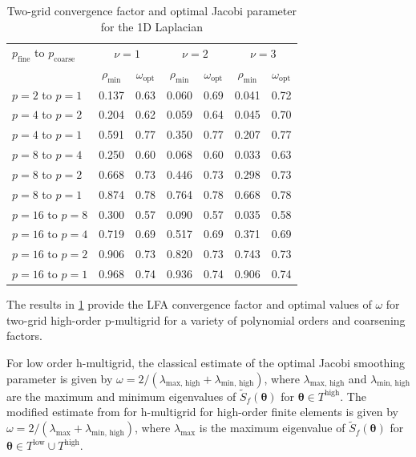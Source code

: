 \documentclass[review]{siamart190516}
\begin{document}
\begin{table}[ht!]
\begin{center}
\begin{tabular}{l cc cc cc}
  \toprule
  $p_{\text{fine}}$ to $p_{\text{coarse}}$  &  \multicolumn{2}{c}{$\nu = 1$}  &  \multicolumn{2}{c}{$\nu = 2$}  &  \multicolumn{2}{c}{$\nu = 3$}  \\
                       &  $\rho_{\min}$ & $\omega_{\text{opt}}$  &  $\rho_{\min}$ & $\omega_{\text{opt}}$  &  $\rho_{\min}$ & $\omega_{\text{opt}}$  \\
  \toprule
  $p = 2$ to $p = 1$   &  0.137 & 0.63  &  0.060 & 0.69  &  0.041 & 0.72   \\
  \midrule
  $p = 4$ to $p = 2$   &  0.204 & 0.62  &  0.059 & 0.64  &  0.045 & 0.70   \\
  $p = 4$ to $p = 1$   &  0.591 & 0.77  &  0.350 & 0.77  &  0.207 & 0.77   \\
  \midrule
  $p = 8$ to $p = 4$   &  0.250 & 0.60  &  0.068 & 0.60  &  0.033 & 0.63   \\
  $p = 8$ to $p = 2$   &  0.668 & 0.73  &  0.446 & 0.73  &  0.298 & 0.73   \\
  $p = 8$ to $p = 1$   &  0.874 & 0.78  &  0.764 & 0.78  &  0.668 & 0.78   \\
  \midrule
  $p = 16$ to $p = 8$  &  0.300 & 0.57  &  0.090 & 0.57  &  0.035 & 0.58   \\
  $p = 16$ to $p = 4$  &  0.719 & 0.69  &  0.517 & 0.69  &  0.371 & 0.69   \\
  $p = 16$ to $p = 2$  &  0.906 & 0.73  &  0.820 & 0.73  &  0.743 & 0.73   \\
  $p = 16$ to $p = 1$  &  0.968 & 0.74  &  0.936 & 0.74  &  0.906 & 0.74   \\
  \bottomrule
\end{tabular}
\end{center}
\caption{Two-grid convergence factor and optimal Jacobi parameter for the 1D Laplacian}
\label{table:two_grid_1d}
\end{table}

The results in \cref{table:two_grid_1d} provide the LFA convergence factor and optimal values of $\omega$ for two-grid high-order p-multigrid for a variety of polynomial orders and coarsening factors.

For low order h-multigrid, the classical estimate of the optimal Jacobi smoothing parameter is given by $\omega = 2 / \left( \lambda_{\text{max, high}} + \lambda_{\text{min, high}} \right)$, where $\lambda_{\text{max, high}}$ and $\lambda_{\text{min, high}}$ are the maximum and minimum eigenvalues of $\tilde{S}_f \left( \boldsymbol{\theta} \right)$ for $\boldsymbol{\theta} \in T^{\text{high}}$.
The modified estimate from \cite{he2020two} for h-multigrid for high-order finite elements is given by $\omega = 2 / \left( \lambda_{\text{max}} + \lambda_{\text{min, high}} \right)$, where $\lambda_{\text{max}}$ is the maximum eigenvalue of $\tilde{S}_f \left( \boldsymbol{\theta} \right)$ for $\boldsymbol{\theta} \in T^{\text{low}} \cup T^{\text{high}}$.
\end{document}
